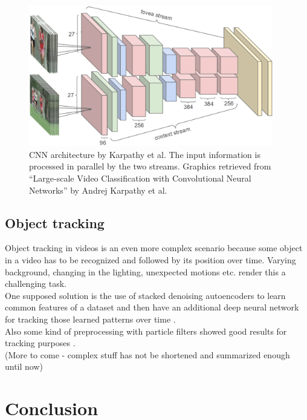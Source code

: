 \documentclass[12pt,twoside]{article}
\theoremstyle{plain}
\theoremstyle{definition}
\theoremstyle{remark}
\begin{document}
\begin{figure}
	\centerline{
		\includegraphics[width=0.95\textwidth]{google-architecture.png}
	}
	{\caption{CNN architecture by Karpathy et al. The input information is processed in parallel by the two streams. Graphics retrieved from \enquote{Large-scale Video Classification with Convolutional Neural Networks} by Andrej Karpathy et al. \cite{GoogleLargeScaleVideoClassification-Karpathy}}\label{fig:google-architecture-two-streams}}
\end{figure}


\subsection{Object tracking}

Object tracking in videos is an even more complex scenario because some object in a video has to be recognized and followed by its position over time. Varying background, changing in the lighting, unexpected motions etc. render this a challenging task.
\\
One supposed solution is the use of stacked denoising autoencoders to learn common features of a dataset and then have an additional deep neural network for tracking those learned patterns over time \cite{LearningDeepCompactImageTracking-Wang}.
\\
Also some kind of preprocessing with particle filters showed good results for tracking purposes \cite{LearningDeepCompactImageTracking-Wang}.
\\
(More to come - complex stuff has not be shortened and summarized enough until now)



\section{Conclusion}
\label{sec:concl}
\end{document}
